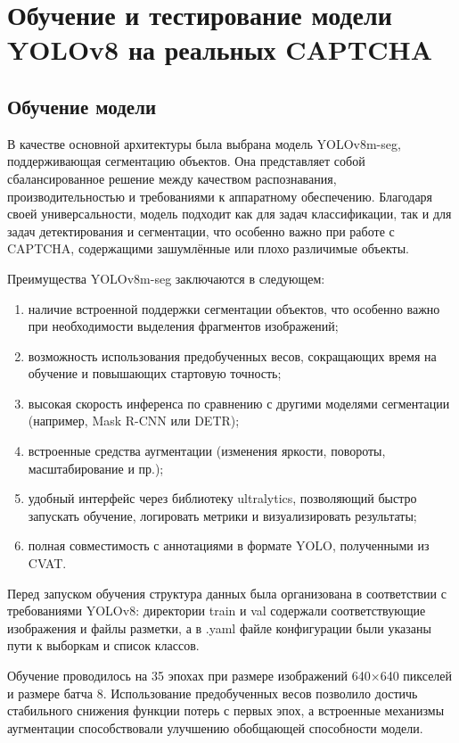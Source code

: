\chapter{Обучение и тестирование модели YOLOv8 на реальных CAPTCHA}

\section{Обучение модели}

В качестве основной архитектуры была выбрана модель YOLOv8m-seg, поддерживающая сегментацию объектов. Она представляет собой сбалансированное решение между качеством распознавания, производительностью и требованиями к аппаратному обеспечению. Благодаря своей универсальности, модель подходит как для задач классификации, так и для задач детектирования и сегментации, что особенно важно при работе с CAPTCHA, содержащими зашумлённые или плохо различимые объекты.

Преимущества YOLOv8m-seg заключаются в следующем:

\begin{enumerate}
    \item наличие встроенной поддержки сегментации объектов, что особенно важно при необходимости выделения фрагментов изображений;
    \item возможность использования предобученных весов, сокращающих время на обучение и повышающих стартовую точность;
    \item высокая скорость инференса по сравнению с другими моделями сегментации (например, Mask R-CNN или DETR);
    \item встроенные средства аугментации (изменения яркости, повороты, масштабирование и пр.);
    \item удобный интерфейс через библиотеку ultralytics, позволяющий быстро запускать обучение, логировать метрики и визуализировать результаты;
    \item полная совместимость с аннотациями в формате YOLO, полученными из CVAT.
\end{enumerate}

Перед запуском обучения структура данных была организована в соответствии с требованиями YOLOv8: директории train и val содержали соответствующие изображения и файлы разметки, а в .yaml файле конфигурации были указаны пути к выборкам и список классов.

Обучение проводилось на 35 эпохах при размере изображений 640×640 пикселей и размере батча 8. Использование предобученных весов позволило достичь стабильного снижения функции потерь с первых эпох, а встроенные механизмы аугментации способствовали улучшению обобщающей способности модели.

